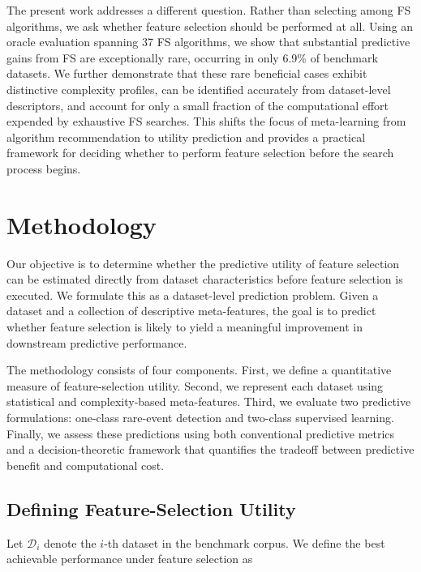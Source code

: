 \documentclass[preprint,12pt,authoryear]{elsarticle}
\begin{document}
The present work addresses a different question. Rather than selecting among FS algorithms, we ask whether feature selection should be performed at all. Using an oracle evaluation spanning 37 FS algorithms, we show that substantial predictive gains from FS are exceptionally rare, occurring in only 6.9\% of benchmark datasets. We further demonstrate that these rare beneficial cases exhibit distinctive complexity profiles, can be identified accurately from dataset-level descriptors, and account for only a small fraction of the computational effort expended by exhaustive FS searches. This shifts the focus of meta-learning from algorithm recommendation to utility prediction and provides a practical framework for deciding whether to perform feature selection before the search process begins.



\section{Methodology}
\label{sec:methodology}

Our objective is to determine whether the predictive utility of feature selection can be estimated directly from dataset characteristics before feature selection is executed. We formulate this as a dataset-level prediction problem. Given a dataset and a collection of descriptive meta-features, the goal is to predict whether feature selection is likely to yield a meaningful improvement in downstream predictive performance.

The methodology consists of four components. First, we define a quantitative measure of feature-selection utility. Second, we represent each dataset using statistical and complexity-based meta-features. Third, we evaluate two predictive formulations: one-class rare-event detection and two-class supervised learning. Finally, we assess these predictions using both conventional predictive metrics and a decision-theoretic framework that quantifies the tradeoff between predictive benefit and computational cost.

\subsection{Defining Feature-Selection Utility}
\label{sec:utility_definition}

Let $\mathcal{D}_i$ denote the $i$-th dataset in the benchmark corpus. 
We define the best achievable performance under feature selection as
\end{document}
